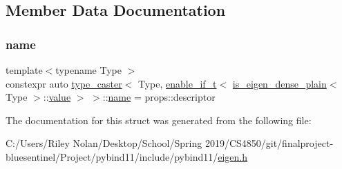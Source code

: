 \subsection{Member Data Documentation}
\mbox{\label{structtype__caster_3_01_type_00_01enable__if__t_3_01is__eigen__dense__plain_3_01_type_01_4_1_1value_01_4_01_4_af7df5aa39b76507a1c06399841c3dd96}} 
\subsubsection{\texorpdfstring{name}{name}}
{\footnotesize\ttfamily template$<$typename Type $>$ \\
constexpr auto \mbox{\hyperlink{classtype__caster}{type\+\_\+caster}}$<$ Type, \mbox{\hyperlink{detail_2common_8h_a012819c9e8b5e04872a271f50f8b8196}{enable\+\_\+if\+\_\+t}}$<$ \mbox{\hyperlink{eigen_8h_a93c6985faade6e9052f9e0917826b26d}{is\+\_\+eigen\+\_\+dense\+\_\+plain}}$<$ Type $>$\+::\mbox{\hyperlink{_s_d_l__opengl__glext_8h_a8ad81492d410ff2ac11f754f4042150f}{value}} $>$ $>$\+::\mbox{\hyperlink{structname}{name}} = props\+::descriptor\hspace{0.3cm}{\ttfamily [static]}}



The documentation for this struct was generated from the following file\+:\begin{DoxyCompactItemize}
\item 
C\+:/\+Users/\+Riley Nolan/\+Desktop/\+School/\+Spring 2019/\+C\+S4850/git/finalproject-\/bluesentinel/\+Project/pybind11/include/pybind11/\mbox{\hyperlink{eigen_8h}{eigen.\+h}}\end{DoxyCompactItemize}
